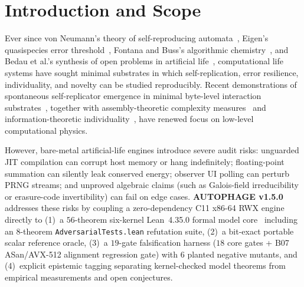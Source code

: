 \documentclass[11pt,reqno]{amsart}
\theoremstyle{plain}
\theoremstyle{definition}
\theoremstyle{remark}
\newcommand{\code}[1]{{\footnotesize\nolinkurl{#1}}}
\begin{document}
\begin{abstract}
\emph{Honest verification boundary:} This preprint is an independent research work and is \textbf{not peer-reviewed}. The Lean theorems certify properties of the formal models in \code{Spec.lean} rather than emitted x86-64 machine code; finite-field and reversible-gate facts (such as the $30$ irreducible binary octics, Toffoli/Fredkin involutions, and $2 \times 2$ nonzero-determinant matrix invertibility) are textbook results checked mechanically against this codebase's definitions. Zero ($0 / 1{,}900$) overarching open problems in the Unsolved Problems Mega-Atlas (\code{AI-045}, \code{BIO-001}, \code{CHEM-052}, \code{SYS-009}) are solved or retired.
\end{abstract}

\maketitle

\section{Introduction and Scope}
\label{sec:intro}

Ever since von Neumann's theory of self-reproducing automata~\cite{vonneumann1966}, Eigen's quasispecies error threshold~\cite{eigen1971}, Fontana and Buss's algorithmic chemistry~\cite{fontana1994}, and Bedau et al.'s synthesis of open problems in artificial life~\cite{bedau2000}, computational life systems have sought minimal substrates in which self-replication, error resilience, individuality, and novelty can be studied reproducibly. Recent demonstrations of spontaneous self-replicator emergence in minimal byte-level interaction substrates~\cite{aguerayarcas2024}, together with assembly-theoretic complexity measures~\cite{sharma2023} and information-theoretic individuality~\cite{krakauer2020}, have renewed focus on low-level computational physics.

However, bare-metal artificial-life engines introduce severe audit risks: unguarded JIT compilation can corrupt host memory or hang indefinitely; floating-point summation can silently leak conserved energy; observer UI polling can perturb PRNG streams; and unproved algebraic claims (such as Galois-field irreducibility or erasure-code invertibility) can fail on edge cases. \textbf{AUTOPHAGE v1.5.0} addresses these risks by coupling a zero-dependency C11 x86-64 RWX engine directly to (1)~a $56$-theorem six-kernel Lean~4.35.0 formal model core~\cite{moura2021,carneiro2024} including an $8$-theorem \code{AdversarialTests.lean} refutation suite, (2)~a bit-exact portable scalar reference oracle, (3)~a $19$-gate falsification harness ($18$ core gates + B07 ASan/AVX-512 alignment regression gate) with $6$ planted negative mutants, and (4)~explicit epistemic tagging separating kernel-checked model theorems from empirical measurements and open conjectures.
\end{document}
